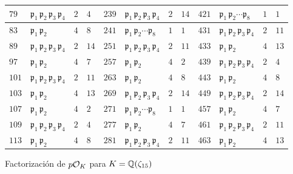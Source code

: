 \begin{figure}
\begin{center}
\begin{tabular}{x{0.75cm}x{1.75cm}x{0.75cm}x{0.9cm}x{0.75cm}x{1.75cm}x{0.75cm}x{0.9cm}x{0.75cm}x{1.75cm}x{0.75cm}x{0.9cm}}
      \hline
      $79$ & $\mathfrak{p}_1\,\mathfrak{p}_2\,\mathfrak{p}_3\,\mathfrak{p}_4$ & $2$ & $4$ & $239$ & $\mathfrak{p}_1\,\mathfrak{p}_2\,\mathfrak{p}_3\,\mathfrak{p}_4$ & $2$ & $14$ & $421$ & $\mathfrak{p}_1\,\mathfrak{p}_2\cdots\mathfrak{p}_8$ & $1$ & $1$ \tabularnewline
      \hline
      $83$ & $\mathfrak{p}_1\,\mathfrak{p}_2$ & $4$ & $8$ & $241$ & $\mathfrak{p}_1\,\mathfrak{p}_2\cdots\mathfrak{p}_8$ & $1$ & $1$ & $431$ & $\mathfrak{p}_1\,\mathfrak{p}_2\,\mathfrak{p}_3\,\mathfrak{p}_4$ & $2$ & $11$ \tabularnewline
      \hline
      $89$ & $\mathfrak{p}_1\,\mathfrak{p}_2\,\mathfrak{p}_3\,\mathfrak{p}_4$ & $2$ & $14$ & $251$ & $\mathfrak{p}_1\,\mathfrak{p}_2\,\mathfrak{p}_3\,\mathfrak{p}_4$ & $2$ & $11$ & $433$ & $\mathfrak{p}_1\,\mathfrak{p}_2$ & $4$ & $13$ \tabularnewline
      \hline
      $97$ & $\mathfrak{p}_1\,\mathfrak{p}_2$ & $4$ & $7$ & $257$ & $\mathfrak{p}_1\,\mathfrak{p}_2$ & $4$ & $2$ & $439$ & $\mathfrak{p}_1\,\mathfrak{p}_2\,\mathfrak{p}_3\,\mathfrak{p}_4$ & $2$ & $4$ \tabularnewline
      \hline
      $101$ & $\mathfrak{p}_1\,\mathfrak{p}_2\,\mathfrak{p}_3\,\mathfrak{p}_4$ & $2$ & $11$ & $263$ & $\mathfrak{p}_1\,\mathfrak{p}_2$ & $4$ & $8$ & $443$ & $\mathfrak{p}_1\,\mathfrak{p}_2$ & $4$ & $8$ \tabularnewline
      \hline
      $103$ & $\mathfrak{p}_1\,\mathfrak{p}_2$ & $4$ & $13$ & $269$ & $\mathfrak{p}_1\,\mathfrak{p}_2\,\mathfrak{p}_3\,\mathfrak{p}_4$ & $2$ & $14$ & $449$ & $\mathfrak{p}_1\,\mathfrak{p}_2\,\mathfrak{p}_3\,\mathfrak{p}_4$ & $2$ & $14$ \tabularnewline
      \hline
      $107$ & $\mathfrak{p}_1\,\mathfrak{p}_2$ & $4$ & $2$ & $271$ & $\mathfrak{p}_1\,\mathfrak{p}_2\cdots\mathfrak{p}_8$ & $1$ & $1$ & $457$ & $\mathfrak{p}_1\,\mathfrak{p}_2$ & $4$ & $7$ \tabularnewline
      \hline
      $109$ & $\mathfrak{p}_1\,\mathfrak{p}_2\,\mathfrak{p}_3\,\mathfrak{p}_4$ & $2$ & $4$ & $277$ & $\mathfrak{p}_1\,\mathfrak{p}_2$ & $4$ & $7$ & $461$ & $\mathfrak{p}_1\,\mathfrak{p}_2\,\mathfrak{p}_3\,\mathfrak{p}_4$ & $2$ & $11$ \tabularnewline
      \hline
      $113$ & $\mathfrak{p}_1\,\mathfrak{p}_2$ & $4$ & $8$ & $281$ & $\mathfrak{p}_1\,\mathfrak{p}_2\,\mathfrak{p}_3\,\mathfrak{p}_4$ & $2$ & $11$ & $463$ & $\mathfrak{p}_1\,\mathfrak{p}_2$ & $4$ & $13$ \tabularnewline
      \hline
    \end{tabular}
  \end{center}

  \caption{Factorización de $p\mathcal{O}_K$ para $K = \mathbb{Q} (\zeta_{15})$}
  \label{fig:Q-zeta-15}
\end{figure}

